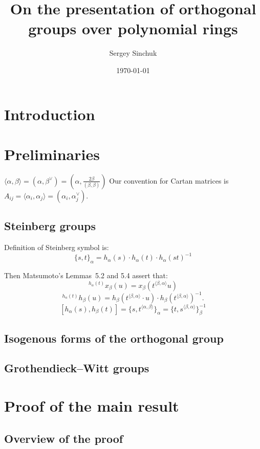 \documentclass[oneside, 10pt]{amsart}
\title{On the presentation of orthogonal groups over polynomial rings}
\author {Sergey Sinchuk}
\date {\today}
\theoremstyle{remark}
\theoremstyle{definition}
\begin{document}
\maketitle
\section{Introduction}
\section{Preliminaries}
$\langle \alpha, \beta \rangle = (\alpha, \beta^\vee) = (\alpha, \frac{2\beta}{(\beta, \beta)})$
Our convention for Cartan matrices is 
$A_{ij} = \langle \alpha_i, \alpha_j \rangle = (\alpha_i, \alpha_j^\vee)$.

\subsection{Steinberg groups}
Definition of Steinberg symbol is:
\[ \{ s, t \}_\alpha = h_\alpha(s) \cdot h_\alpha(t) \cdot h_\alpha(st)^{-1} \]

Then Matsumoto's Lemmas~5.2 and 5.4 assert that:
\[ {}^{h_\alpha(t)}\!x_\beta(u) = x_\beta(t^{\langle \beta,  \alpha \rangle}u)\]
\[ {}^{h_\alpha(t)}\!h_\beta(u) = h_\beta(t^{\langle \beta, \alpha \rangle} \cdot u) \cdot h_\beta(t^{\langle \beta,  \alpha \rangle})^{-1}. \]
\[[h_\alpha(s), h_\beta(t)] = \{s, t^{\langle \alpha, \beta \rangle}\}_\alpha = \{t, s^{\langle \beta, \alpha \rangle}\}_\beta^{-1}\]

\begin{comment}
Suppose for a moment that $\langle \alpha, \beta \rangle = -1$ and  $\langle \beta, \alpha \rangle = -1$ then
\[ \{s, t^{-1} \} = \{s,  t^{-1}\}_\alpha = \{t, s^{-1} \}_\beta^{-1} = \{s^{-1}, t\} \]
In particular, $\{s, s^{-1}\} = \{s, s^{-1}\}^{-1}$ 
\end{comment}

\subsection{Isogenous forms of the orthogonal group}
\subsection{Grothendieck--Witt groups}
\section{Proof of the main result}
\subsection{Overview of the proof}
\end{document}

